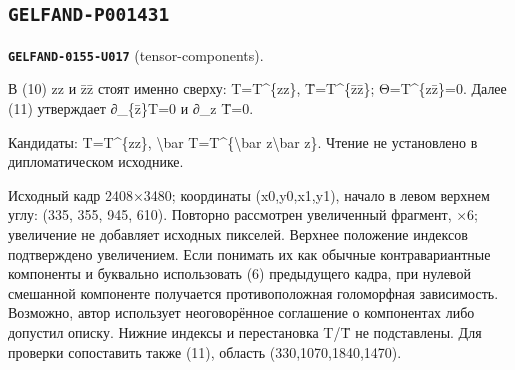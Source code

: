 \subsection*{\texttt{GELFAND-P001431}}
\par\noindent\leavevmode{}\label{GELFAND-0155-U017}\label{GELFAND-P001431:tensor-components}\textbf{\texttt{GELFAND-0155-U017}} (tensor-components).\nopagebreak[4]\par
В (10) zz и z̄z̄ стоят именно сверху: T=T\textasciicircum{}\{zz\}, T̄=T\textasciicircum{}\{z̄z̄\}; Θ=T\textasciicircum{}\{zz̄\}=0. Далее (11) утверждает ∂\_\{z̄\}T=0 и ∂\_z T̄=0.\par
Кандидаты: T=T\textasciicircum{}\{zz\}, \textbackslash{}bar T=T\textasciicircum{}\{\textbackslash{}bar z\textbackslash{}bar z\}. Чтение не установлено в дипломатическом исходнике.\par
Исходный кадр 2408×3480; координаты (x0,y0,x1,y1), начало в левом верхнем углу: (335, 355, 945, 610). Повторно рассмотрен увеличенный фрагмент, ×6; увеличение не добавляет исходных пикселей. Верхнее положение индексов подтверждено увеличением. Если понимать их как обычные контравариантные компоненты и буквально использовать (6) предыдущего кадра, при нулевой смешанной компоненте получается противоположная голоморфная зависимость. Возможно, автор использует неоговорённое соглашение о компонентах либо допустил описку. Нижние индексы и перестановка T/T̄ не подставлены. Для проверки сопоставить также (11), область (330,1070,1840,1470).\par
\medskip
